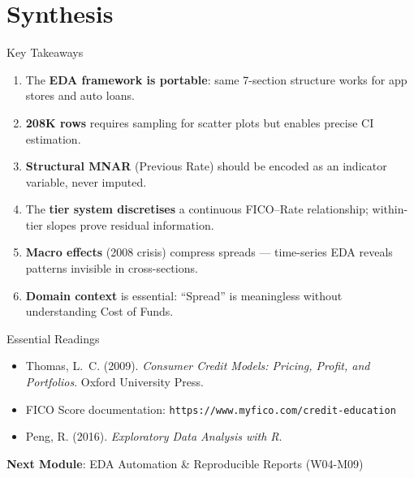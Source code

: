 \documentclass[10pt]{beamer}
\begin{document}
\section{Synthesis}

\begin{frame}{Key Takeaways}
  \begin{enumerate}
    \item The \textbf{EDA framework is portable}: same 7-section structure
          works for app stores and auto loans.
    \item \textbf{208K rows} requires sampling for scatter plots but
          enables precise CI estimation.
    \item \textbf{Structural MNAR} (Previous Rate) should be encoded as
          an indicator variable, never imputed.
    \item The \textbf{tier system discretises} a continuous FICO--Rate
          relationship; within-tier slopes prove residual information.
    \item \textbf{Macro effects} (2008 crisis) compress spreads ---
          time-series EDA reveals patterns invisible in cross-sections.
    \item \textbf{Domain context} is essential: ``Spread'' is meaningless
          without understanding Cost of Funds.
  \end{enumerate}
\end{frame}

\begin{frame}{Essential Readings}
  \begin{itemize}
    \item Thomas, L.~C. (2009). \emph{Consumer Credit Models: Pricing,
          Profit, and Portfolios}. Oxford University Press.
    \item FICO Score documentation:
          \texttt{https://www.myfico.com/credit-education}
    \item Peng, R. (2016). \emph{Exploratory Data Analysis with R}.
  \end{itemize}
  \vspace{6pt}
  \textbf{Next Module}: EDA Automation \& Reproducible Reports (W04-M09)
\end{frame}
\end{document}
